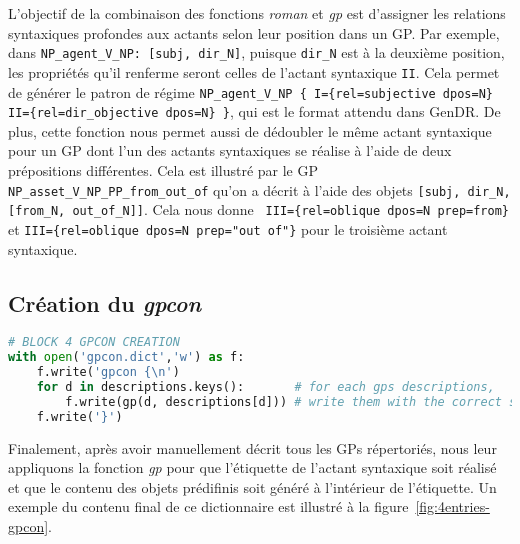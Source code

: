 L'objectif de la combinaison des fonctions \emph{roman} et \emph{gp} est d'assigner les relations syntaxiques profondes aux actants selon leur position dans un \ac{GP}. Par exemple, dans \lstinline|NP_agent_V_NP: [subj, dir_N]|, puisque \texttt{dir\_N} est à la deuxième position, les propriétés qu'il renferme seront celles de l'actant syntaxique \texttt{II}. Cela permet de générer le patron de régime \lstinline|NP_agent_V_NP { I={rel=subjective dpos=N} II={rel=dir_objective dpos=N} }|, qui est le format attendu dans GenDR. De plus, cette fonction nous permet aussi de dédoubler le même actant syntaxique pour un \ac{GP} dont l'un des actants syntaxiques se réalise à l'aide de deux prépositions différentes. Cela est illustré par le \ac{GP} \lstinline|NP_asset_V_NP_PP_from_out_of| qu'on a décrit à l'aide des objets \lstinline|[subj, dir_N, [from_N, out_of_N]]|. Cela nous donne \lstinline| III={rel=oblique dpos=N prep=from}| et \lstinline|III={rel=oblique dpos=N prep="out of"}| pour le troisième actant syntaxique.

\subsection{Création du \emph{gpcon}}

\begin{lstlisting}[language=Python, caption = Création du dictionnaire de patrons de régime]
# BLOCK 4 GPCON CREATION
with open('gpcon.dict','w') as f: 
    f.write('gpcon {\n')
    for d in descriptions.keys():       # for each gps descriptions,
        f.write(gp(d, descriptions[d])) # write them with the correct syntactic label
    f.write('}')
\end{lstlisting}
Finalement, après avoir manuellement décrit tous les \acp{GP} répertoriés, nous leur appliquons la fonction \emph{gp} pour que l'étiquette de l'actant syntaxique soit réalisé et que le contenu des objets prédifinis soit généré à l'intérieur de l'étiquette. Un exemple du contenu final de ce dictionnaire est illustré à la figure~\ref{fig:4entries-gpcon}.

